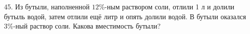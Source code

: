 45. Из бутыли, наполненной $12\%$-ным раствором соли, отлили 1 л и долили бутыль водой, затем отлили ещё литр и опять долили водой. В бутыли оказался $3\%$-ный раствор соли. Какова вместимость бутыли?\\
